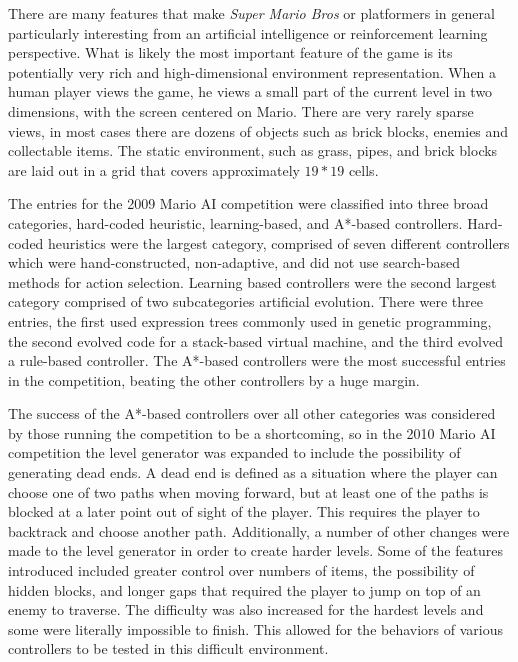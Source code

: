 \documentclass[12pt]{article}
\begin{document}
\begin{multicols}{2}
There are many features that make \textit {Super Mario Bros} or platformers in general particularly interesting from 
an artificial intelligence or reinforcement learning perspective. What is likely the most important feature of the game 
is its potentially very rich and high-dimensional environment representation. When a human player views the 
game, he views a small part of the current level in two dimensions, with the screen centered on Mario. There are 
very rarely sparse views, in most cases there are dozens of objects such as brick blocks, enemies and collectable 
items. The static environment, such as grass, pipes, and brick blocks are laid out in a grid that covers 
approximately $19 * 19$ cells.

The entries for the 2009 Mario AI competition were classified into three broad categories, hard-coded heuristic, 
learning-based, and A*-based controllers. Hard-coded heuristics were the largest category, comprised of seven 
different controllers which were hand-constructed, non-adaptive, and did not use search-based methods for action 
selection. Learning based controllers were the second largest category comprised of two subcategories artificial 
evolution. There were three entries, the first used expression trees commonly used in genetic programming, the 
second evolved code for a stack-based virtual machine, and the third evolved a rule-based controller. The A*-based 
controllers were the most successful entries in the competition, beating the other controllers by a huge margin.

The success of the A*-based controllers over all other categories was considered by those running the competition 
to be a shortcoming, so in the 2010 Mario AI competition the level generator was expanded to include the possibility 
of generating dead ends. A dead end is defined as a situation where the player can choose one of two paths when 
moving forward, but at least one of the paths is blocked  
at a later point out of sight of the player. This requires the player to backtrack and choose another 
path. Additionally, a number of other changes were made to the level generator in order to create harder levels. 
Some of the features introduced included greater control over numbers of items, the possibility of hidden blocks, and 
longer gaps that required the player to jump on top of an enemy to traverse. 
The difficulty was also increased for the hardest levels and some were literally impossible to finish. This 
allowed for the behaviors of various controllers to be tested in this difficult environment.


\end{multicols}
\end{document}

